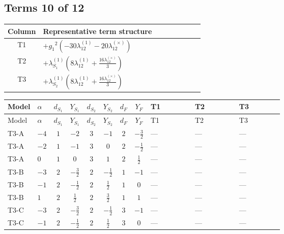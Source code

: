 \documentclass[8pt]{article}
\begin{document}
\begin{landscape}
\subsection*{Terms 10 of 12}
\begin{center}
\begin{tabular}{@{}c >{\raggedright\arraybackslash}p{0.82\linewidth}@{}}
\toprule
Column & Representative term structure \\
\midrule
T1 & \(\displaystyle +{g_1}^2 (-30 {\lambda_{12}^{(1)}}-20 {\lambda_{12}^{(\times)}})\) \\
\midrule
T2 & \(\displaystyle +{\lambda_{S_1}^{(1)}} \left(8 {\lambda_{12}^{(1)}}+\frac{16 {\lambda_{12}^{(\times)}}}{3}\right)\) \\
\midrule
T3 & \(\displaystyle +{\lambda_{S_2}^{(1)}} \left(8 {\lambda_{12}^{(1)}}+\frac{16 {\lambda_{12}^{(\times)}}}{3}\right)\) \\
\midrule
\bottomrule
\end{tabular}
\end{center}
\smallskip
\tiny
\begin{longtable}{@{}llcccccc >{\raggedright\arraybackslash}p{0.21\linewidth} >{\raggedright\arraybackslash}p{0.21\linewidth} >{\raggedright\arraybackslash}p{0.21\linewidth}@{}}
\toprule
Model & $\alpha$ & $d_{S_1}$ & $Y_{S_1}$ & $d_{S_2}$ & $Y_{S_2}$ & $d_F$ & $Y_F$ & T1 & T2 & T3 \\
\midrule
\endfirsthead
\toprule
Model & $\alpha$ & $d_{S_1}$ & $Y_{S_1}$ & $d_{S_2}$ & $Y_{S_2}$ & $d_F$ & $Y_F$ & T1 & T2 & T3 \\
\midrule
\endhead
T3-A & $-4$ & $1$ & $-2$ & $3$ & $-1$ & $2$ & $-\frac{3}{2}$ & --- & --- & --- \\
\midrule
T3-A & $-2$ & $1$ & $-1$ & $3$ & $0$ & $2$ & $-\frac{1}{2}$ & --- & --- & --- \\
\midrule
T3-A & $0$ & $1$ & $0$ & $3$ & $1$ & $2$ & $\frac{1}{2}$ & --- & --- & --- \\
\midrule
T3-B & $-3$ & $2$ & $-\frac{3}{2}$ & $2$ & $-\frac{1}{2}$ & $1$ & $-1$ & --- & --- & --- \\
\midrule
T3-B & $-1$ & $2$ & $-\frac{1}{2}$ & $2$ & $\frac{1}{2}$ & $1$ & $0$ & --- & --- & --- \\
\midrule
T3-B & $1$ & $2$ & $\frac{1}{2}$ & $2$ & $\frac{3}{2}$ & $1$ & $1$ & --- & --- & --- \\
\midrule
T3-C & $-3$ & $2$ & $-\frac{3}{2}$ & $2$ & $-\frac{1}{2}$ & $3$ & $-1$ & --- & --- & --- \\
\midrule
T3-C & $-1$ & $2$ & $-\frac{1}{2}$ & $2$ & $\frac{1}{2}$ & $3$ & $0$ & --- & --- & --- \\

\end{longtable}
\end{landscape}
\end{document}
